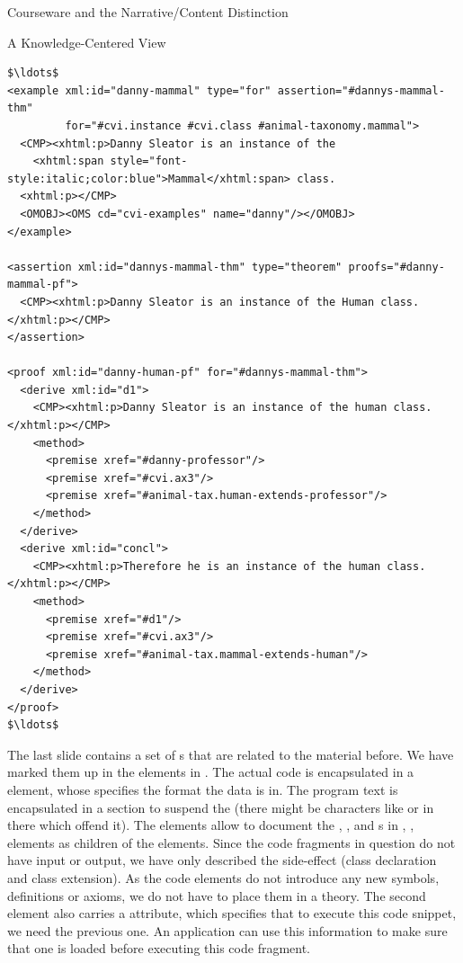 \begin{tchapter}[id=courseware]{Courseware and the Narrative/Content Distinction}
\begin{tsection}[id=knowledge-centered]{A Knowledge-Centered View}
\begin{lstlisting}[label=lst:var-cvi-ex,mathescape,
    caption={An Alternative Representation Using {\element{example}} Elements},
    index={example,proof,assertion,derive,premise}]
$\ldots$
<example xml:id="danny-mammal" type="for" assertion="#dannys-mammal-thm"
         for="#cvi.instance #cvi.class #animal-taxonomy.mammal">
  <CMP><xhtml:p>Danny Sleator is an instance of the 
    <xhtml:span style="font-style:italic;color:blue">Mammal</xhtml:span> class. 
  <xhtml:p></CMP>
  <OMOBJ><OMS cd="cvi-examples" name="danny"/></OMOBJ>
</example>

<assertion xml:id="dannys-mammal-thm" type="theorem" proofs="#danny-mammal-pf">
  <CMP><xhtml:p>Danny Sleator is an instance of the Human class.</xhtml:p></CMP>
</assertion>

<proof xml:id="danny-human-pf" for="#dannys-mammal-thm">
  <derive xml:id="d1">
    <CMP><xhtml:p>Danny Sleator is an instance of the human class.</xhtml:p></CMP>
    <method>
      <premise xref="#danny-professor"/>
      <premise xref="#cvi.ax3"/>
      <premise xref="#animal-tax.human-extends-professor"/>
    </method>
  </derive>
  <derive xml:id="concl">
    <CMP><xhtml:p>Therefore he is an instance of the human class.</xhtml:p></CMP>
    <method>
      <premise xref="#d1"/>
      <premise xref="#cvi.ax3"/>
      <premise xref="#animal-tax.mammal-extends-human"/>
    </method>
  </derive>
</proof>
$\ldots$
\end{lstlisting}

The last slide contains a set of {} {s} that are
related to the material before.  We have marked them up in the {} elements
in {}. The actual code is encapsulated in a {} element,
whose {} specifies the format the data is in. The program text is
encapsulated in a {} section to suspend the {\xml} {}
(there might be characters like {\snippet{<}} or {\snippet{\&}} in there which offend it).
The {} elements allow to document the {},
{}, and {s} in {},
{}, {} elements as children of the {}
elements. Since the code fragments in question do not have input or output, we have only
described the side-effect (class declaration and class extension). As the code elements do
not introduce any new symbols, definitions or axioms, we do not have to place them in a
theory. The second {} element also carries a {}
attribute, which specifies that to execute this code snippet, we need the previous one. An
application can use this information to make sure that one is loaded before executing this
code fragment.


\end{tsection}
\end{tchapter}
